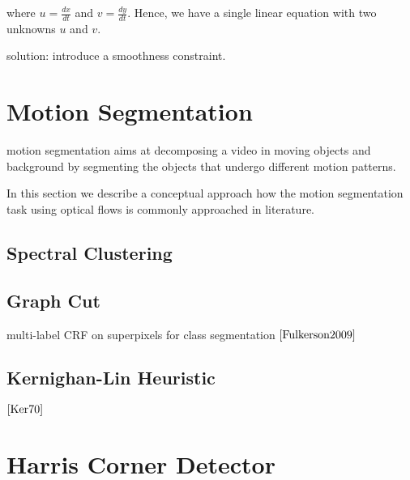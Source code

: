 where $u = \frac{dx}{dt}$ and $v = \frac{dy}{dt}$. Hence, we have a single linear equation with two unknowns $u$ and $v$.

solution: introduce a smoothness constraint.


\section{Motion Segmentation}
motion segmentation aims at decomposing a video in moving objects and background by segmenting the objects that undergo different motion patterns.

In this section we describe a conceptual approach how the motion segmentation task using optical flows is commonly approached in literature. 

\subsection{Spectral Clustering}
\subsection{Graph Cut}

multi-label CRF on superpixels for class segmentation $\cite{Fulkerson2009}$

\subsection{Kernighan-Lin Heuristic}


$\cite{Ker70}$


\section{Harris Corner Detector}
\label{sec:harris_corner_detector}


